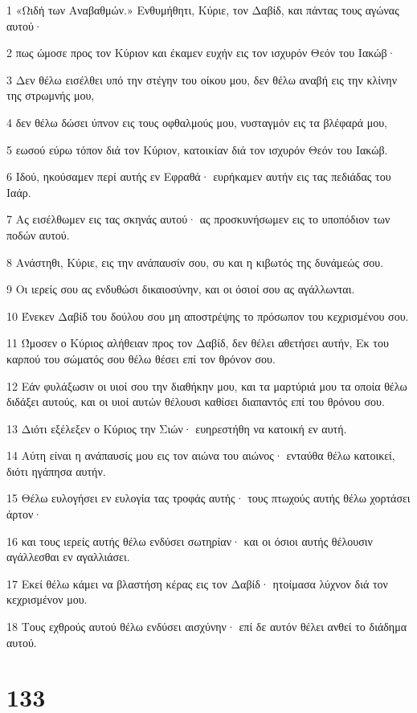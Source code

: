 \par 1 «Ωιδή των Αναβαθμών.» Ενθυμήθητι, Κύριε, τον Δαβίδ, και πάντας τους αγώνας αυτού·
\par 2 πως ώμοσε προς τον Κύριον και έκαμεν ευχήν εις τον ισχυρόν Θεόν του Ιακώβ·
\par 3 Δεν θέλω εισέλθει υπό την στέγην του οίκου μου, δεν θέλω αναβή εις την κλίνην της στρωμνής μου,
\par 4 δεν θέλω δώσει ύπνον εις τους οφθαλμούς μου, νυσταγμόν εις τα βλέφαρά μου,
\par 5 εωσού εύρω τόπον διά τον Κύριον, κατοικίαν διά τον ισχυρόν Θεόν του Ιακώβ.
\par 6 Ιδού, ηκούσαμεν περί αυτής εν Εφραθά· ευρήκαμεν αυτήν εις τας πεδιάδας του Ιαάρ.
\par 7 Ας εισέλθωμεν εις τας σκηνάς αυτού· ας προσκυνήσωμεν εις το υποπόδιον των ποδών αυτού.
\par 8 Ανάστηθι, Κύριε, εις την ανάπαυσίν σου, συ και η κιβωτός της δυνάμεώς σου.
\par 9 Οι ιερείς σου ας ενδυθώσι δικαιοσύνην, και οι όσιοί σου ας αγάλλωνται.
\par 10 Ένεκεν Δαβίδ του δούλου σου μη αποστρέψης το πρόσωπον του κεχρισμένου σου.
\par 11 Ώμοσεν ο Κύριος αλήθειαν προς τον Δαβίδ, δεν θέλει αθετήσει αυτήν, Εκ του καρπού του σώματός σου θέλω θέσει επί τον θρόνον σου.
\par 12 Εάν φυλάξωσιν οι υιοί σου την διαθήκην μου, και τα μαρτύριά μου τα οποία θέλω διδάξει αυτούς, και οι υιοί αυτών θέλουσι καθίσει διαπαντός επί του θρόνου σου.
\par 13 Διότι εξέλεξεν ο Κύριος την Σιών· ευηρεστήθη να κατοική εν αυτή.
\par 14 Αύτη είναι η ανάπαυσίς μου εις τον αιώνα του αιώνος· ενταύθα θέλω κατοικεί, διότι ηγάπησα αυτήν.
\par 15 Θέλω ευλογήσει εν ευλογία τας τροφάς αυτής· τους πτωχούς αυτής θέλω χορτάσει άρτον·
\par 16 και τους ιερείς αυτής θέλω ενδύσει σωτηρίαν· και οι όσιοι αυτής θέλουσιν αγάλλεσθαι εν αγαλλιάσει.
\par 17 Εκεί θέλω κάμει να βλαστήση κέρας εις τον Δαβίδ· ητοίμασα λύχνον διά τον κεχρισμένον μου.
\par 18 Τους εχθρούς αυτού θέλω ενδύσει αισχύνην· επί δε αυτόν θέλει ανθεί το διάδημα αυτού.

\chapter{133}

